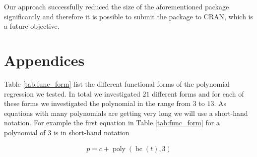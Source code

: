\documentclass[12pt,a4paper]{article}
\DeclareMathOperator{\bc}{bc}
\DeclareMathOperator{\poly}{poly}
\begin{document}
Our approach successfully reduced the size of the aforementioned package
significantly and therefore it is possible to submit the package to
\ac{CRAN}, which is a future objective.

\pagebreak

\setcounter{page}{3}
\printbibliography[title = References]
\cleardoublepage

\begin{refsection}

\nocite{R-base}
\nocite{R-knitr}
\nocite{R-class}
\nocite{R-dplyr}
\nocite{R-glmnet}
\nocite{R-purrr}
\nocite{R-rstudioapi}
\nocite{R-stringr}
\nocite{R-tictoc}
\nocite{R-tidyr}
\nocite{R-Studio}
\nocite{wickham_readr_2021}
\nocite{wickham_ggplot2_2021}
\nocite{simpson_permute_2019}
\nocite{cetinkaya-rundel_openintro_2021}
\nocite{zhu_kableextra_2021}
\nocite{auguie_gridextra_2017}
\nocite{wilke_cowplot_2020}
\nocite{moritz_imputets_2021}
\nocite{narzo_tsdyn_2020}
\nocite{wallig_doparallel_2020}
\nocite{wallig_foreach_2020}
\nocite{muller_tibble_2021}
\nocite{wickham_pryr_2021}
\nocite{bache_magrittr_2020}
\nocite{vaughan_furrr_2021}


\printbibliography[title = Software-References]
\end{refsection}

\cleardoublepage
\appendix
\setcounter{table}{0}
\setcounter{figure}{0}
\renewcommand{\thetable}{A\arabic{table}}
\renewcommand{\thefigure}{A\arabic{figure}}


\hypertarget{appendices}{%
\section{Appendices}\label{appendices}}

Table \ref{tab:func_form} list the different functional forms of the
polynomial regression we tested. In total we investigated \(21\)
different forms and for each of these forms we investigated the
polynomial in the range from \(3\) to \(13\). As equations with many
polynomials are getting very long we will use a short-hand notation. For
example the first equation in Table \ref{tab:func_form} for a polynomial
of \(3\) is in short-hand notation

\begin{align}
    p = c + \poly\left( \bc(t), 3 \right)
\end{align}
\end{document}
